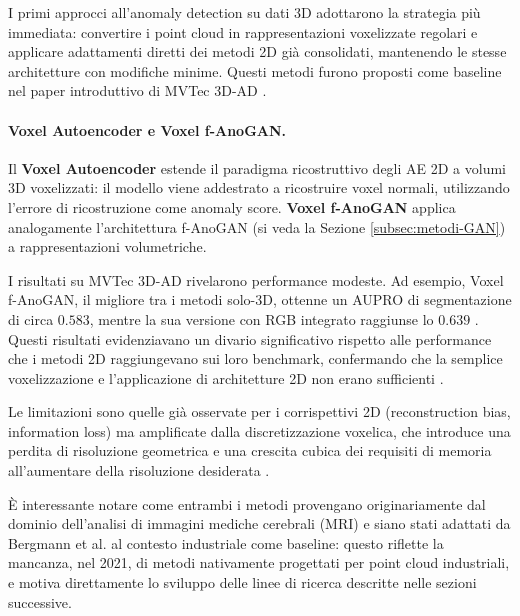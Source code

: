 I primi approcci all'anomaly detection su dati 3D adottarono la strategia più immediata: convertire i point cloud in rappresentazioni voxelizzate regolari e applicare adattamenti diretti dei metodi 2D già consolidati, mantenendo le stesse architetture con modifiche minime. Questi metodi furono proposti come baseline nel paper introduttivo di MVTec 3D-AD \cite{bergmann2021mvtec3d}.

\paragraph{Voxel Autoencoder e Voxel f-AnoGAN.}
Il \textbf{Voxel Autoencoder} \cite{bengs2021voxelae} estende il paradigma ricostruttivo degli AE 2D a volumi 3D voxelizzati: il modello viene addestrato a ricostruire voxel normali, utilizzando l'errore di ricostruzione come anomaly score. \textbf{Voxel f-AnoGAN} \cite{simarroviana2021voxelfanogan} applica analogamente l'architettura f-AnoGAN (si veda la Sezione \ref{subsec:metodi-GAN}) a rappresentazioni volumetriche.

I risultati su MVTec 3D-AD rivelarono performance modeste. Ad esempio, Voxel f-AnoGAN, il migliore tra i metodi solo-3D, ottenne un AUPRO di segmentazione di circa $0.583$, mentre la sua versione con RGB integrato raggiunse lo $0.639$ \cite{bergmann2021mvtec3d}. Questi risultati evidenziavano un divario significativo rispetto alle performance che i metodi 2D raggiungevano sui loro benchmark, confermando che la semplice voxelizzazione e l'applicazione di architetture 2D non erano sufficienti \cite{bergmann2021mvtec3d}.

Le limitazioni sono quelle già osservate per i corrispettivi 2D (reconstruction bias, information loss) ma amplificate dalla discretizzazione voxelica, che introduce una perdita di risoluzione geometrica e una crescita cubica dei requisiti di memoria all'aumentare della risoluzione desiderata \cite{qi2016volumetric}.

È interessante notare come entrambi i metodi provengano originariamente dal dominio dell'analisi di immagini mediche cerebrali (MRI) e siano stati adattati da Bergmann et al. al contesto industriale come baseline: questo riflette la mancanza, nel 2021, di metodi nativamente progettati per point cloud industriali, e motiva direttamente lo sviluppo delle linee di ricerca descritte nelle sezioni successive.

